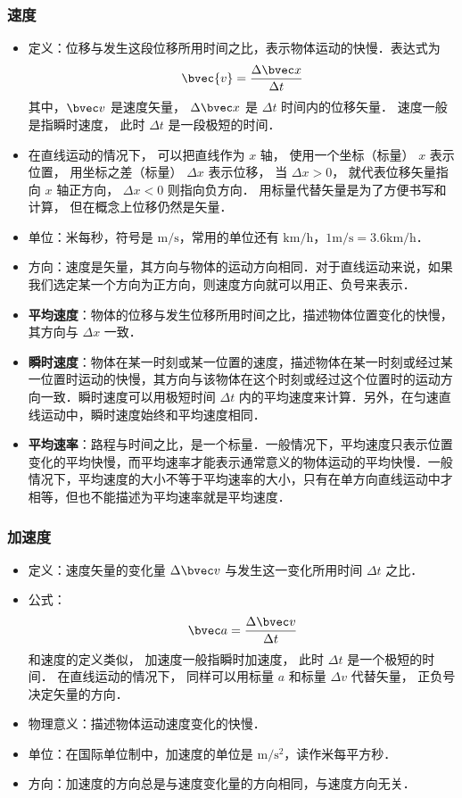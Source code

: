 \subsubsection{速度}
\begin{itemize}
\item 定义：位移与发生这段位移所用时间之比，表示物体运动的快慢．表达式为
\begin{equation}\label{HSPM01_eq3}
\bvec{v} = \frac{\Delta \bvec x}{\Delta t}
\end{equation}
其中，$\bvec v$ 是速度矢量， $\Delta \bvec x$ 是 $\Delta t$ 时间内的位移矢量． 速度一般是指瞬时速度， 此时 $\Delta t$ 是一段极短的时间．
\item 在直线运动的情况下， 可以把直线作为 $x$ 轴， 使用一个坐标（标量） $x$ 表示位置， 用坐标之差（标量） $\Delta x$ 表示位移， 当 $\Delta x > 0$， 就代表位移矢量指向 $x$ 轴正方向， $\Delta x < 0$ 则指向负方向． 用标量代替矢量是为了方便书写和计算， 但在概念上位移仍然是矢量．
\item 单位：米每秒，符号是 $\mathrm{m/s}$，常用的单位还有 $\mathrm{km/h}$，$1\mathrm{m/s}=3.6\mathrm{km/h}$．
\item 方向：速度是矢量，其方向与物体的运动方向相同．对于直线运动来说，如果我们选定某一个方向为正方向，则速度方向就可以用正、负号来表示．
\item \textbf{平均速度}：物体的位移与发生位移所用时间之比，描述物体位置变化的快慢，其方向与 $\Delta x$ 一致．
\item \textbf{瞬时速度}：物体在某一时刻或某一位置的速度，描述物体在某一时刻或经过某一位置时运动的快慢，其方向与该物体在这个时刻或经过这个位置时的运动方向一致．瞬时速度可以用极短时间 $\Delta t$ 内的平均速度来计算．另外，在匀速直线运动中，瞬时速度始终和平均速度相同．
\item \textbf{平均速率}：路程与时间之比，是一个标量．一般情况下，平均速度只表示位置变化的平均快慢，而平均速率才能表示通常意义的物体运动的平均快慢．一般情况下，平均速度的大小不等于平均速率的大小，只有在单方向直线运动中才相等，但也不能描述为平均速率就是平均速度．
\end{itemize}

\subsubsection{加速度}
\begin{itemize}
\item 定义：速度矢量的变化量 $\Delta \bvec v$ 与发生这一变化所用时间 $\Delta t$ 之比．
\item 公式：
\begin{equation}
\bvec a=\frac{\Delta \bvec v}{\Delta t}
\end{equation}
和速度的定义类似， 加速度一般指瞬时加速度， 此时 $\Delta t$ 是一个极短的时间． 在直线运动的情况下， 同样可以用标量 $a$ 和标量 $\Delta v$ 代替矢量， 正负号决定矢量的方向．
\item 物理意义：描述物体运动速度变化的快慢．
\item 单位：在国际单位制中，加速度的单位是 $\mathrm{m/s^2}$，读作米每平方秒．
\item 方向：加速度的方向总是与速度变化量的方向相同，与速度方向无关．
\end{itemize}

